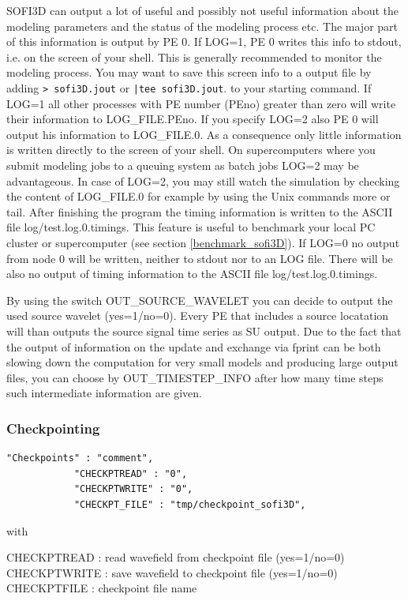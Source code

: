 \documentclass[11pt,onecolumn,oneside]{article}
\begin{document}
SOFI3D can output a lot of useful and possibly not useful information about the modeling parameters and the status of the modeling process etc. The major part of this information is output by PE 0.
If LOG=1, PE 0 writes this info to stdout, i.e. on the screen of your shell. This is generally recommended  to monitor the modeling process. You may want to save this screen info to a output file by adding  \lstinline{> sofi3D.jout} or  \lstinline{|tee sofi3D.jout}. to your starting command. If LOG=1 all other processes with PE number (PEno) greater than zero will write their information to LOG\_FILE.PEno. If you specify LOG=2 also PE 0 will output his information to LOG\_FILE.0. As a consequence only little information is written directly to the screen of your shell. On supercomputers where you submit modeling jobs to a queuing system as batch jobs LOG=2 may be advantageous. In case of LOG=2, you may still watch the simulation by checking the content of LOG\_FILE.0 for example by using the Unix commands more or tail. After finishing the program the timing information is written to the ASCII file log/test.log.0.timings. This feature is useful to benchmark your local PC cluster or supercomputer (see section \ref{benchmark_sofi3D}). If LOG=0 no output from node 0 will be written, neither to stdout nor to an LOG file. There will be also no output of timing information to the ASCII file log/test.log.0.timings. 

By using the switch OUT\_SOURCE\_WAVELET you can decide to output the used source wavelet (yes=1/no=0). Every PE that includes a source locatation will than outputs the source signal time series as SU output. Due to the fact that the output of information on the update and exchange via fprint can be both slowing down the computation for very small models and producing large output files, you can choose by OUT\_TIMESTEP\_INFO after how many time steps such intermediate information are given.

\subsubsection{Checkpointing}
\begin{verbatim}
"Checkpoints" : "comment",
            "CHECKPTREAD" : "0",
            "CHECKPTWRITE" : "0",
            "CHECKPT_FILE" : "tmp/checkpoint_sofi3D",
\end{verbatim}

with 

CHECKPTREAD : read wavefield from checkpoint file (yes=1/no=0)\\
CHECKPTWRITE : save wavefield to checkpoint file (yes=1/no=0)\\
CHECKPTFILE : checkpoint file name\\
\end{document}
